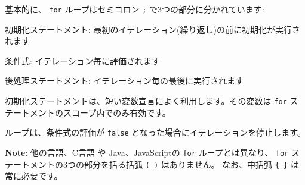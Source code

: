 基本的に、 \texttt{for} ループはセミコロン \texttt{;} で3つの部分に分かれています:

\begin{description}
  \item 初期化ステートメント: 最初のイテレーション(繰り返し)の前に初期化が実行されます
  \item 条件式: イテレーション毎に評価されます
  \item 後処理ステートメント: イテレーション毎の最後に実行されます
\end{description}
初期化ステートメントは、短い変数宣言によく利用します。その変数は \texttt{for} ステートメントのスコープ内でのみ有効です。

ループは、条件式の評価が \texttt{false} となった場合にイテレーションを停止します。

\textbf{Note}: 他の言語、C言語 や Java、JavaScriptの \texttt{for} ループとは異なり、
\texttt{for} ステートメントの3つの部分を括る括弧 \texttt{( )} はありません。
なお、中括弧 \texttt{\{ \}} は常に必要です。